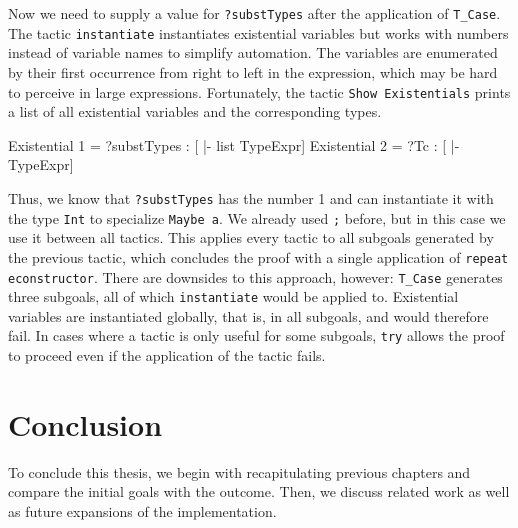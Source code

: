 \documentclass[paper = a4, fleqn, abstract=on, twoside]{scrreprt}
\begin{document}
\par
Now we need to supply a value for \texttt{?substTypes} after the application of \texttt{T\_Case}. The tactic \texttt{instantiate} instantiates existential variables but works with numbers instead of variable names to simplify automation. The variables are enumerated by their first occurrence from right to left in the expression, which may be hard to perceive in large expressions. Fortunately, the tactic \texttt{Show Existentials} prints a list of all existential variables and the corresponding types.
\begin{coqcode}
Existential 1 = ?substTypes : [ |- list TypeExpr] 
Existential 2 = ?Tc : [ |- TypeExpr] 
\end{coqcode}
Thus, we know that \texttt{?substTypes} has the number 1 and can instantiate it with the type \texttt{Int} to specialize \texttt{Maybe a}. We already used \texttt{;} before, but in this case we use it between all tactics. This applies every tactic to all subgoals generated by the previous tactic, which concludes the proof with a single application of \texttt{repeat econstructor}. There are downsides to this approach, however: \texttt{T\_Case} generates three subgoals, all of which \texttt{instantiate} would be applied to. Existential variables are instantiated globally, that is, in all subgoals, and would therefore fail. In cases where a tactic is only useful for some subgoals, \texttt{try} allows the proof to proceed even if the application of the tactic fails.
\chapter{Conclusion}
To conclude this thesis, we begin with recapitulating previous chapters and compare the initial goals with the outcome. Then, we discuss related work as well as future expansions of the implementation.
\end{document}
